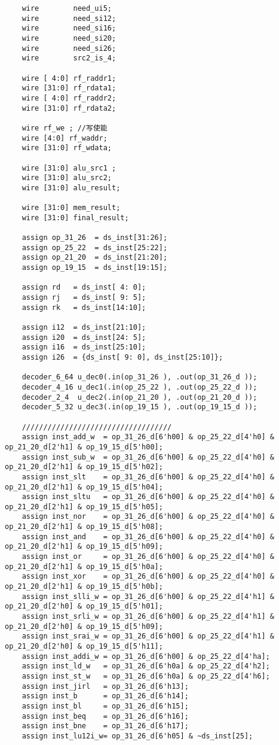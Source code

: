 \begin{lstlisting}
    wire        need_ui5;
    wire        need_si12;
    wire        need_si16;
    wire        need_si20;
    wire        need_si26;
    wire        src2_is_4;

    wire [ 4:0] rf_raddr1;
    wire [31:0] rf_rdata1;
    wire [ 4:0] rf_raddr2;
    wire [31:0] rf_rdata2;

    wire rf_we ; //写使能
    wire [4:0] rf_waddr;
    wire [31:0] rf_wdata;

    wire [31:0] alu_src1 ;
    wire [31:0] alu_src2;
    wire [31:0] alu_result;

    wire [31:0] mem_result;
    wire [31:0] final_result;

    assign op_31_26  = ds_inst[31:26];
    assign op_25_22  = ds_inst[25:22];
    assign op_21_20  = ds_inst[21:20];
    assign op_19_15  = ds_inst[19:15];

    assign rd   = ds_inst[ 4: 0];
    assign rj   = ds_inst[ 9: 5];
    assign rk   = ds_inst[14:10];
                
    assign i12  = ds_inst[21:10];
    assign i20  = ds_inst[24: 5];
    assign i16  = ds_inst[25:10];
    assign i26  = {ds_inst[ 9: 0], ds_inst[25:10]};

    decoder_6_64 u_dec0(.in(op_31_26 ), .out(op_31_26_d ));
    decoder_4_16 u_dec1(.in(op_25_22 ), .out(op_25_22_d ));
    decoder_2_4  u_dec2(.in(op_21_20 ), .out(op_21_20_d ));
    decoder_5_32 u_dec3(.in(op_19_15 ), .out(op_19_15_d ));

    ///////////////////////////////////
    assign inst_add_w  = op_31_26_d[6'h00] & op_25_22_d[4'h0] & op_21_20_d[2'h1] & op_19_15_d[5'h00];
    assign inst_sub_w  = op_31_26_d[6'h00] & op_25_22_d[4'h0] & op_21_20_d[2'h1] & op_19_15_d[5'h02];
    assign inst_slt    = op_31_26_d[6'h00] & op_25_22_d[4'h0] & op_21_20_d[2'h1] & op_19_15_d[5'h04];
    assign inst_sltu   = op_31_26_d[6'h00] & op_25_22_d[4'h0] & op_21_20_d[2'h1] & op_19_15_d[5'h05];
    assign inst_nor    = op_31_26_d[6'h00] & op_25_22_d[4'h0] & op_21_20_d[2'h1] & op_19_15_d[5'h08];
    assign inst_and    = op_31_26_d[6'h00] & op_25_22_d[4'h0] & op_21_20_d[2'h1] & op_19_15_d[5'h09];
    assign inst_or     = op_31_26_d[6'h00] & op_25_22_d[4'h0] & op_21_20_d[2'h1] & op_19_15_d[5'h0a];
    assign inst_xor    = op_31_26_d[6'h00] & op_25_22_d[4'h0] & op_21_20_d[2'h1] & op_19_15_d[5'h0b];
    assign inst_slli_w = op_31_26_d[6'h00] & op_25_22_d[4'h1] & op_21_20_d[2'h0] & op_19_15_d[5'h01];
    assign inst_srli_w = op_31_26_d[6'h00] & op_25_22_d[4'h1] & op_21_20_d[2'h0] & op_19_15_d[5'h09];
    assign inst_srai_w = op_31_26_d[6'h00] & op_25_22_d[4'h1] & op_21_20_d[2'h0] & op_19_15_d[5'h11];
    assign inst_addi_w = op_31_26_d[6'h00] & op_25_22_d[4'ha];
    assign inst_ld_w   = op_31_26_d[6'h0a] & op_25_22_d[4'h2];
    assign inst_st_w   = op_31_26_d[6'h0a] & op_25_22_d[4'h6];
    assign inst_jirl   = op_31_26_d[6'h13];
    assign inst_b      = op_31_26_d[6'h14];
    assign inst_bl     = op_31_26_d[6'h15];
    assign inst_beq    = op_31_26_d[6'h16];
    assign inst_bne    = op_31_26_d[6'h17];
    assign inst_lu12i_w= op_31_26_d[6'h05] & ~ds_inst[25];


\end{lstlisting}
